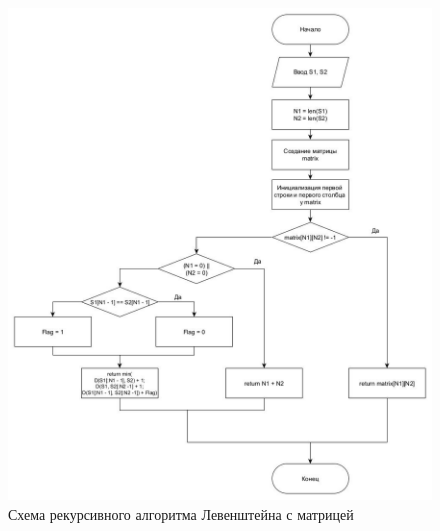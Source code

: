 \begin{figure}[hp]
    \begin{center}
        \includegraphics[width=\linewidth]{graph/LevenRecMatr.jpg}
    \end{center}
    \caption{Схема рекурсивного алгоритма Левенштейна с матрицей}
\end{figure}

